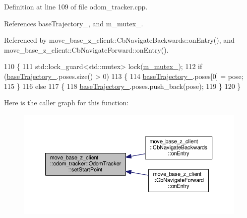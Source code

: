 Definition at line 109 of file odom\+\_\+tracker.\+cpp.



References base\+Trajectory\+\_\+, and m\+\_\+mutex\+\_\+.



Referenced by move\+\_\+base\+\_\+z\+\_\+client\+::\+Cb\+Navigate\+Backwards\+::on\+Entry(), and move\+\_\+base\+\_\+z\+\_\+client\+::\+Cb\+Navigate\+Forward\+::on\+Entry().


\begin{DoxyCode}
110 \{
111     std::lock\_guard<std::mutex> lock(\hyperlink{classmove__base__z__client_1_1odom__tracker_1_1OdomTracker_a63676e03be48b18ac48d5e2f11f19a25}{m\_mutex\_});
112     \textcolor{keywordflow}{if} (\hyperlink{classmove__base__z__client_1_1odom__tracker_1_1OdomTracker_a83fa5a9bfe0b2683eee33444d3f030ea}{baseTrajectory\_}.poses.size() > 0)
113     \{
114         \hyperlink{classmove__base__z__client_1_1odom__tracker_1_1OdomTracker_a83fa5a9bfe0b2683eee33444d3f030ea}{baseTrajectory\_}.poses[0] = pose;
115     \}
116     \textcolor{keywordflow}{else}
117     \{
118         \hyperlink{classmove__base__z__client_1_1odom__tracker_1_1OdomTracker_a83fa5a9bfe0b2683eee33444d3f030ea}{baseTrajectory\_}.poses.push\_back(pose);
119     \}
120 \}
\end{DoxyCode}


Here is the caller graph for this function\+:\nopagebreak
\begin{figure}[H]
\begin{center}
\leavevmode
\includegraphics[width=350pt]{classmove__base__z__client_1_1odom__tracker_1_1OdomTracker_afa402777496c8d0df39191f40377bd0e_icgraph}
\end{center}
\end{figure}


